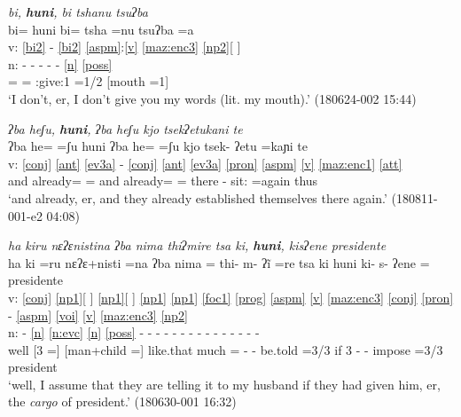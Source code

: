 \documentclass[output=paper]{langscibook}
\begin{document}
\ex \label{ex:p2} \textit{bi\4, \textbf{hu\1ni\2}, bi\4 \st{}tsha\2\1nu\4\2 \ssn{}tsu\1\st{}ʔba\3\2}\\
 \gllll {} bi\4= hu\1ni\2 bi\4= tsha\2 =\1nu\4\2 \ssn{}tsu\1ʔba\3\ff{} =a\2\\
 v: \ref{bi2} - \ref{bi2} \ref{aspm}:\ref{v} \ref{maz:enc3} \ref{np2}[ ]\\
 n: - - - - - \ref{n} \ref{poss}\\
{} \Neg= \Fill{} \Neg= \Hab:give:1 =1\Sg/2\Pl{} [mouth =1\Sg]\\
\glt `I don't, er, I don't give you my words (lit. my mouth).' (180624-002 15:44)

\ex \label{ex:p3} \textit{ʔba\1 he\2ʃu\3, \textbf{hu\1ni\2}, ʔba\1 he\2ʃu\3 kjo\1 tse\2kʔe\4\st{}\ssn{}tu\2\ssn{}ka\2ni\3{} \ssn{}te\1} \\ %
\glll {} ʔba\1 he\2\ff= =ʃu\3\ff{} hu\1ni\2 ʔba\1 he\2\ff= =ʃu\3\ff{} kjo\1 tse\2k- ʔe\4\ssn{}tu\2 =\ssn{}ka\2ɲi\3\ff{} \ssn{}te\1\\ %
v: \ref{conj} \ref{ant} \ref{ev3a} - \ref{conj} \ref{ant} \ref{ev3a} \ref{pron} \ref{aspm} \ref{v} \ref{maz:enc1} \ref{att}\\
{} and already= =\Rep{} \Fill{} and already= =\Rep{} there \Pfv- sit:\Pl{} =again thus\\
\glt `and already, er, and they already established themselves there again.' (180811-001-e2 04:08)

\ex \label{ex:p4} \textit{ha\1 \st{}k\lab{}i\2ru\1 nɛ\1ʔɛ\2ni\1\st{}sti\2\3na\1 ʔba\1 ni\1\st{}ma\1\3 thi\2\st{}ʔmi\4re\1 tsa\2 \st{}k\lab{}i\2, \textbf{hu\1ni\2}, ki\2sʔe\2\st{}ne\tlg{}\4\1 pre\2si\2den\2\3\st{}te\1}\\
 \gllll {} ha\1 k\lab{}i\2 =ru\1 nɛ\1ʔɛ\2+ni\1sti\2\3 =na\1 ʔba\1 ni\1ma\1 =\3\ff{} thi\2- m- ʔĩ\4 =re\1 tsa\2 k\lab{}i\2 hu\1ni\2 ki\2- s- ʔe\2ne\4 =\tlg{}\1 pre\2si\2den\2\3te\1\\
 v: \ref{conj} \ref{np1}[ ] \ref{np1}[ ] \ref{np1} \ref{np1} \ref{foc1} \ref{prog} \ref{aspm} \ref{v} \ref{maz:enc3} \ref{conj} \ref{pron} - \ref{aspm} \ref{voi} \ref{v} \ref{maz:enc3} \ref{np2}\\
 n: - \ref{n} \ref{n:evc} \ref{n} \ref{poss} - - - - - - - - - - - - - - -\\
{} well [\Pronom{}3 =\Assm{}] [man+child =\Sg{}] like.that much =\Foc{} \Prog- \Hab- be.told =3/3 if \Pronom{}3 \Fill{} \Pfv- \Impers- impose =3/3 president\\
\glt `well, I assume that they are telling it to my husband if they had given him, er, the \textit{cargo} of president.' (180630-001 16:32)
\end{document}
